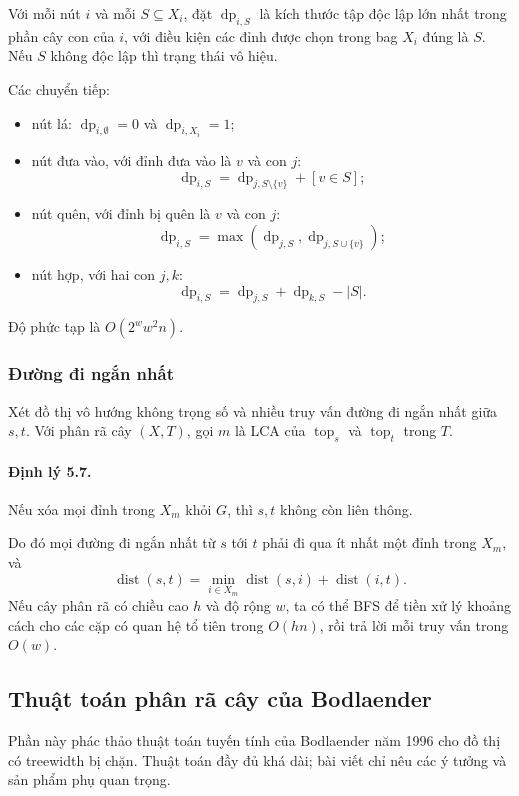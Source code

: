 \documentclass[11pt]{article}
\begin{document}
Với mỗi nút $i$ và mỗi $S\subseteq X_i$, đặt $\operatorname{dp}_{i,S}$ là kích
thước tập độc lập lớn nhất trong phần cây con của $i$, với điều kiện các đỉnh
được chọn trong bag $X_i$ đúng là $S$. Nếu $S$ không độc lập thì trạng thái vô
hiệu.

Các chuyển tiếp:
\begin{itemize}
  \item nút lá: $\operatorname{dp}_{i,\emptyset}=0$ và
  $\operatorname{dp}_{i,X_i}=1$;
  \item nút đưa vào, với đỉnh đưa vào là $v$ và con $j$:
  \[
    \operatorname{dp}_{i,S}=
    \operatorname{dp}_{j,S\setminus\{v\}}+[v\in S];
  \]
  \item nút quên, với đỉnh bị quên là $v$ và con $j$:
  \[
    \operatorname{dp}_{i,S}=
    \max(\operatorname{dp}_{j,S},\operatorname{dp}_{j,S\cup\{v\}});
  \]
  \item nút hợp, với hai con $j,k$:
  \[
    \operatorname{dp}_{i,S}=
    \operatorname{dp}_{j,S}+\operatorname{dp}_{k,S}-|S|.
  \]
\end{itemize}
Độ phức tạp là $O(2^w w^2 n)$.

\subsubsection{Đường đi ngắn nhất}

Xét đồ thị vô hướng không trọng số và nhiều truy vấn đường đi ngắn nhất giữa
$s,t$. Với phân rã cây $(X,T)$, gọi $m$ là LCA của
$\operatorname{top}_s$ và $\operatorname{top}_t$ trong $T$.

\paragraph{Định lý 5.7.}
Nếu xóa mọi đỉnh trong $X_m$ khỏi $G$, thì $s,t$ không còn liên thông.

Do đó mọi đường đi ngắn nhất từ $s$ tới $t$ phải đi qua ít nhất một đỉnh trong
$X_m$, và
\[
  \operatorname{dist}(s,t)=
  \min_{i\in X_m}\operatorname{dist}(s,i)+\operatorname{dist}(i,t).
\]
Nếu cây phân rã có chiều cao $h$ và độ rộng $w$, ta có thể BFS để tiền xử lý
khoảng cách cho các cặp có quan hệ tổ tiên trong $O(hn)$, rồi trả lời mỗi truy
vấn trong $O(w)$.

\subsection{Thuật toán phân rã cây của Bodlaender}

Phần này phác thảo thuật toán tuyến tính của Bodlaender năm 1996 cho đồ thị có
treewidth bị chặn. Thuật toán đầy đủ khá dài; bài viết chỉ nêu các ý tưởng và
sản phẩm phụ quan trọng.
\end{document}

